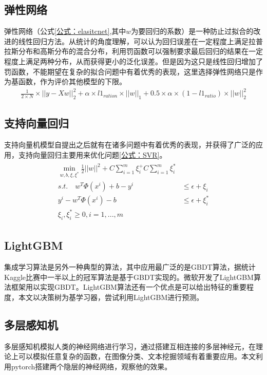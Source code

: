 \documentclass{article}
\begin{document}
\begin{multicols}{2}
\subsection{弹性网络}
弹性网络（公式\ref{公式：elasitcnet},其中$w$为要回归的系数）是一种防止过拟合的改进的线性回归方法。从统计的角度理解，可以认为回归误差在一定程度上满足拉普拉斯分布和高斯分布的混合分布，利用罚函数可以强制要求最后回归的结果在一定程度上满足两种分布，从而获得更小的泛化误差。但是因为这只是线性回归增加了罚函数，不能期望在复杂的拟合问题中有着优秀的表现，这里选择弹性网络只是作为基函数，作为评价其他模型的下限。
\begin{align}\label{公式：elasitcnet}
\frac{1}{2\times N} \times ||y-Xw||_2^2+\alpha \times l1_{ration}\times ||w||_1 +0.5 \times \alpha \times (1-l1_{ratio})\times ||w||_2^2 
\end{align}
\subsection{支持向量回归}
支持向量机模型自提出之后就有在诸多问题中有着优秀的表现，并获得了广泛的应用，支持向量回归主要用来优化问题\ref{公式：SVR}。
\begin{align}
	\begin{split}\label{公式：SVR}
		\min_{w,b,\xi,\xi^*} \frac{1}{2}||w||^2+C\sum_{i=1}^{m}\xi_i^+C\sum_{i=1}^{m}\xi_i^*\\
		s.t. \quad w^T\Phi(x^i)+b-y^i&\leq \epsilon+\xi_i\\
		y^i-w^T\Phi(x^i)-b &\leq \epsilon +\xi_i^*\\
		\xi_i,\xi_i^* \geq 0,i=1,...,m 
	\end{split}
\end{align}
\subsection{LightGBM}
集成学习算法是另外一种典型的算法，其中应用最广泛的是GBDT算法，据统计Kaggle比赛中一半以上的冠军算法是基于GBDT实现的。微软开发了LightGBM\cite{lightGBM}算法框架用以实现GBDT。LightGBM算法还有一个优点是可以给出特征的重要程度，本文以决策树为基学习器，尝试利用LightGBM进行预测。
\subsection{多层感知机}
多层感知机模拟人类的神经网络进行学习，通过搭建互相连接的多层神经元，在理论上可以模拟任意复杂的函数，在图像分类、文本挖掘领域有着重要应用。本文利用pytorch搭建两个隐层的神经网络，观察他的效果。

\end{multicols}
\end{document}
